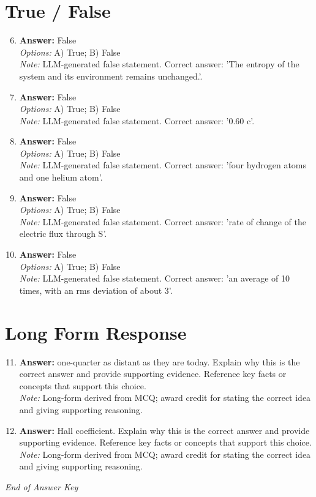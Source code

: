 \documentclass[12pt]{article}
\begin{document}
\section*{True / False}
\begin{enumerate}[label=\arabic*.]
\setcounter{enumi}{5}
\item \textbf{Answer:} False
\\ \textit{Options:} A) True; B) False
\\ \textit{Note:} LLM-generated false statement. Correct answer: 'The entropy of the system and its environment remains unchanged.'.
\item \textbf{Answer:} False
\\ \textit{Options:} A) True; B) False
\\ \textit{Note:} LLM-generated false statement. Correct answer: '0.60 c'.
\item \textbf{Answer:} False
\\ \textit{Options:} A) True; B) False
\\ \textit{Note:} LLM-generated false statement. Correct answer: 'four hydrogen atoms and one helium atom'.
\item \textbf{Answer:} False
\\ \textit{Options:} A) True; B) False
\\ \textit{Note:} LLM-generated false statement. Correct answer: 'rate of change of the electric flux through S'.
\item \textbf{Answer:} False
\\ \textit{Options:} A) True; B) False
\\ \textit{Note:} LLM-generated false statement. Correct answer: 'an average of 10 times, with an rms deviation of about 3'.
\end{enumerate}

\section*{Long Form Response}
\begin{enumerate}[label=\arabic*.]
\setcounter{enumi}{10}
\item \textbf{Answer:} one-quarter as distant as they are today. Explain why this is the correct answer and provide supporting evidence. Reference key facts or concepts that support this choice.
\\ \textit{Note:} Long-form derived from MCQ; award credit for stating the correct idea and giving supporting reasoning.
\item \textbf{Answer:} Hall coefficient. Explain why this is the correct answer and provide supporting evidence. Reference key facts or concepts that support this choice.
\\ \textit{Note:} Long-form derived from MCQ; award credit for stating the correct idea and giving supporting reasoning.
\end{enumerate}

\vfill
\noindent\textit{End of Answer Key}
\end{document}
